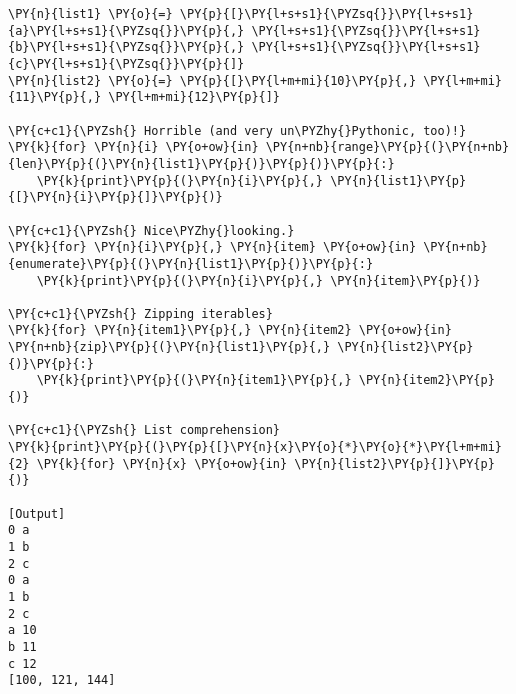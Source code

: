 \begin{Verbatim}[label=\makebox{\url{https://github.com/lucabaldini/cmepda/tree/master/slides/latex/snippets/iteration.py}},commandchars=\\\{\}]
\PY{n}{list1} \PY{o}{=} \PY{p}{[}\PY{l+s+s1}{\PYZsq{}}\PY{l+s+s1}{a}\PY{l+s+s1}{\PYZsq{}}\PY{p}{,} \PY{l+s+s1}{\PYZsq{}}\PY{l+s+s1}{b}\PY{l+s+s1}{\PYZsq{}}\PY{p}{,} \PY{l+s+s1}{\PYZsq{}}\PY{l+s+s1}{c}\PY{l+s+s1}{\PYZsq{}}\PY{p}{]}
\PY{n}{list2} \PY{o}{=} \PY{p}{[}\PY{l+m+mi}{10}\PY{p}{,} \PY{l+m+mi}{11}\PY{p}{,} \PY{l+m+mi}{12}\PY{p}{]}

\PY{c+c1}{\PYZsh{} Horrible (and very un\PYZhy{}Pythonic, too)!}
\PY{k}{for} \PY{n}{i} \PY{o+ow}{in} \PY{n+nb}{range}\PY{p}{(}\PY{n+nb}{len}\PY{p}{(}\PY{n}{list1}\PY{p}{)}\PY{p}{)}\PY{p}{:}
    \PY{k}{print}\PY{p}{(}\PY{n}{i}\PY{p}{,} \PY{n}{list1}\PY{p}{[}\PY{n}{i}\PY{p}{]}\PY{p}{)}

\PY{c+c1}{\PYZsh{} Nice\PYZhy{}looking.}
\PY{k}{for} \PY{n}{i}\PY{p}{,} \PY{n}{item} \PY{o+ow}{in} \PY{n+nb}{enumerate}\PY{p}{(}\PY{n}{list1}\PY{p}{)}\PY{p}{:}
    \PY{k}{print}\PY{p}{(}\PY{n}{i}\PY{p}{,} \PY{n}{item}\PY{p}{)}

\PY{c+c1}{\PYZsh{} Zipping iterables}
\PY{k}{for} \PY{n}{item1}\PY{p}{,} \PY{n}{item2} \PY{o+ow}{in} \PY{n+nb}{zip}\PY{p}{(}\PY{n}{list1}\PY{p}{,} \PY{n}{list2}\PY{p}{)}\PY{p}{:}
    \PY{k}{print}\PY{p}{(}\PY{n}{item1}\PY{p}{,} \PY{n}{item2}\PY{p}{)}

\PY{c+c1}{\PYZsh{} List comprehension}
\PY{k}{print}\PY{p}{(}\PY{p}{[}\PY{n}{x}\PY{o}{*}\PY{o}{*}\PY{l+m+mi}{2} \PY{k}{for} \PY{n}{x} \PY{o+ow}{in} \PY{n}{list2}\PY{p}{]}\PY{p}{)}

[Output]
0 a
1 b
2 c
0 a
1 b
2 c
a 10
b 11
c 12
[100, 121, 144]
\end{Verbatim}